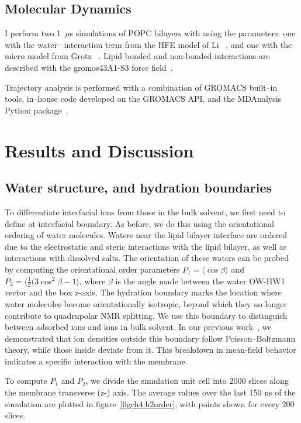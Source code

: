 \subsection{Molecular Dynamics}

I perform two 1~$\mu$s simulations of POPC bilayers with \mgcl{} using the 
parameters: one with the water--\mg{} interaction term from the HFE model of Li
\etal~\cite{merzhfe}, and one with the \mg{} micro model from Grotz
\etal~\cite{grotz:2021:optimized,micro}. Lipid bonded and non-bonded interactions
are described with the gromos43A1-S3 force field~\cite{chiu:2009}.

Trajectory analysis is performed with a combination of GROMACS built--in tools,
in--house code developed on the GROMACS API, and the MDAnalysis Python package~\cite{mdanalysis1,mdanalysis2}.


\section{Results and Discussion}

\subsection{Water structure, and hydration boundaries}
To differentiate interfacial ions from those in the bulk solvent, we first need to define at interfacial boundary. As before\cite{saunders:2024}, we do this using the orientational ordering of water molecules. Waters near the lipid bilayer interface are ordered due to the electrostatic and steric interactions with the lipid bilayer, as well as interactions with dissolved salts. The
orientation of these waters can be probed by computing the orientational order parameters $P_1=\langle\cos{\beta}\rangle$ and $P_2=\langle{\frac{1}{2}(3\cos^{2}{\beta}-1}\rangle$, where $\beta$ is the angle made between the water OW-HW1 vector and the box z-axis. The hydration boundary marks the location where water molecules become orientationally isotropic, beyond which they no longer contribute to quadrupolar NMR splitting. We use this boundary to distinguish between adsorbed ions and ions in bulk solvent. In our previous work~\cite{saunders:2024}, we demonstrated that ion densities outside this boundary follow Poisson–Boltzmann theory, while those inside deviate from it. This breakdown in mean-field behavior indicates a specific interaction with the membrane. 

To compute $P_1$ and $P_2$, we divide the simulation unit cell into 2000 slices along the membrane transverse (z-) axis.  
The average values over the last 150 ns of the simulation are plotted in figure~\ref{figch4:h2order}, with points shown for every 200 slices. 

